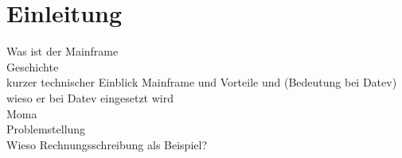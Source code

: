 \chapter{Einleitung}\label{ch:einleitung}

Was ist der Mainframe\\
Geschichte\\
kurzer technischer Einblick Mainframe und Vorteile und (Bedeutung bei Datev) \\
wieso er bei Datev eingesetzt wird \\
 Moma \\
 Problemstellung \\
 Wieso Rechnungsschreibung als Beispiel? \\
